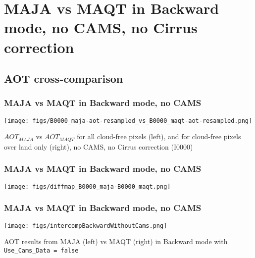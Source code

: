 \documentclass[8pt]{beamer}
\begin{document}
\section{MAJA vs MAQT in Backward mode, no CAMS, no Cirrus correction}

\subsection{AOT cross-comparison}
\begin{frame}
\frametitle{MAJA vs MAQT in Backward mode, no CAMS}
	\begin{center}
		\texttt{[image: figs/B0000\_maja-aot-resampled\_vs\_B0000\_maqt-aot-resampled.png]}
	\end{center}
	
	$AOT_{MAJA}$ vs $AOT_{MAQT}$ for all cloud-free pixels (left), and for cloud-free pixels over land only (right), no CAMS, no Cirrus correction (I0000)
\end{frame}

\begin{frame}
\frametitle{MAJA vs MAQT in Backward mode, no CAMS}
	\begin{center}
		\texttt{[image: figs/diffmap\_B0000\_maja-B0000\_maqt.png]}
	\end{center}
\end{frame}

\begin{frame}
\frametitle{MAJA vs MAQT in Backward mode, no CAMS}
	\begin{center}
		\texttt{[image: figs/intercompBackwardWithoutCams.png]}
	\end{center}
	
	AOT results from MAJA (left) vs MAQT (right) in Backward mode with \texttt{Use\_Cams\_Data = false}
\end{frame}


\end{document}
